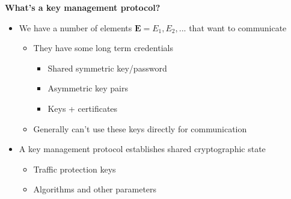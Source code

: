 \documentclass[helvetica]{seminar}
\newcommand{\heading}[1]{%
  \begin{center} 
    \large\bf 
    #1 
  \end{center} 
  \vspace{.4 in}}
\begin{document}
\begin{slide}
\heading{What's a key management protocol?}

\begin{itemize}
\item We have a number of elements $\mathbf{E} = E_1, E_2, ...$ that want to communicate
\begin{itemize}
\item They have some long term credentials
\begin{itemize}
\item Shared symmetric key/password
\item Asymmetric key pairs
\item Keys + certificates
\end{itemize}
\item Generally can't use these keys directly for communication
\end{itemize}
\item A key management protocol establishes shared cryptographic state
\begin{itemize}
\item Traffic protection keys
\item Algorithms and other parameters
\end{itemize}
\end{itemize}
\end{slide}
\end{document}
